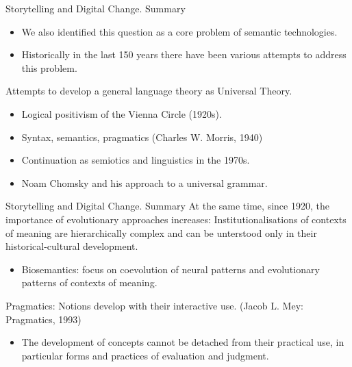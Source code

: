 \documentclass{beamer}
\begin{document}
\begin{frame}{Storytelling and Digital Change. Summary}
\begin{itemize}
\item We also identified this question as a core problem of semantic
  technologies.
\item Historically in the last 150 years there have been various attempts to
  address this problem.
\end{itemize}

Attempts to develop a general language theory as Universal Theory.
\begin{itemize}
\item Logical positivism of the Vienna Circle (1920s).
\item Syntax, semantics, pragmatics (Charles W. Morris, 1940)
\item Continuation as semiotics and linguistics in the 1970s.
\item Noam Chomsky and his approach to a universal grammar.
\end{itemize}
\end{frame}

\begin{frame}{Storytelling and Digital Change. Summary}
At the same time, since 1920, the importance of evolutionary approaches
increases: Institutionalisations of contexts of meaning are hierarchically
complex and can be unterstood only in their historical-cultural development.
\begin{itemize}
\item Biosemantics: focus on coevolution of neural patterns and evolutionary
  patterns of contexts of meaning.
\end{itemize}
Pragmatics: Notions develop with their interactive use.  (Jacob L. Mey:
Pragmatics, 1993)
\begin{itemize}
\item The development of concepts cannot be detached from their practical use,
  in particular forms and practices of evaluation and judgment.
\end{itemize}
\end{frame}
\end{document}
